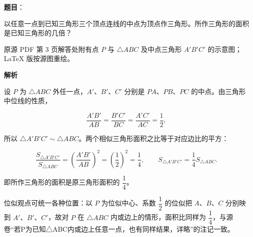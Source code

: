 \begin{answer}

\textbf{题目}：

以任意一点到已知三角形三个顶点连线的中点为顶点作三角形。所作三角形的面积是已知三角形的几倍？

\begin{gktip}
原源 PDF 第 3 页解答处附有点 $P$ 与 $\triangle ABC$ 及中点三角形 $A'B'C'$ 的示意图；LaTeX 版按源图重绘。
\end{gktip}
\nopagebreak[4]
\begin{center}\end{center}
\nopagebreak[4]
\textbf{解析}
\nopagebreak[4]
\begin{center}\end{center}
\nopagebreak[4]
设 $P$ 为 $\triangle ABC$ 外任一点，$A'\text{、}B'\text{、}C'$ 分别是 $PA\text{、}PB\text{、}PC$ 的中点。由三角形中位线的性质，

\nopagebreak[4]
\[
\frac{A'B'}{AB}=\frac{B'C'}{BC}=\frac{A'C'}{AC}=\frac12,
\]

所以 $\triangle A'B'C'\sim\triangle ABC$。两个相似三角形面积之比等于对应边比的平方：

\nopagebreak[4]
\[
\frac{S_{\triangle A'B'C'}}{S_{\triangle ABC}}
=\left(\frac{A'B'}{AB}\right)^2
=\left(\frac12\right)^2
=\frac14,
\qquad
S_{\triangle A'B'C'}=\frac14S_{\triangle ABC}.
\]

即所作三角形的面积是原三角形面积的 $\dfrac14$。

位似观点可统一各种位置：以 $P$ 为位似中心、系数 $\dfrac12$ 的位似把 $A\text{、}B\text{、}C$ 分别映到 $A'\text{、}B'\text{、}C'$，故对 $P$ 在 $\triangle ABC$ 内或边上的情形，面积比同样为 $\dfrac14$，与源卷“若P为已知△ABC内或边上任意一点，也有同样结果，详略”的注记一致。


\end{answer}

